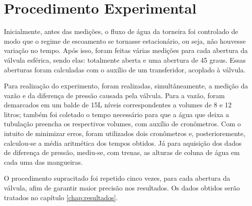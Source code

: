 \chapter{Procedimento Experimental}
\label{chap:procedimento}



Inicialmente, antes das medições, o fluxo de água da torneira foi controlado de
modo que o regime de escoamento se tornasse estacionário, ou seja, não houvesse
variação no tempo. Após isso, foram feitas várias medições para cada abertura da
válvula esférica, sendo elas: totalmente aberta e uma abertura de 45 graus.
Essas aberturas foram calculadas com o auxílio de um transferidor, acoplado à
válvula. 

Para realização do experimento, foram realizadas, simultâneamente, a medição da
vazão e da diferença de pressão causada pela válvula. Para a vazão, foram
demarcados em um balde de 15L níveis correspondentes a volumes de 8 e 12 litros;
também foi coletado o tempo necessário para que a água que deixa a tubulação
preencha os respectivos volumes, com auxílio de cronômetros.  Com o intuito de
minimizar erros, foram utilizados dois cronômetros e, posterioremente,
calculou-se a média aritmética dos tempos obtidos. Já para aquisição dos dados
de diferença de pressão, mediu-se, com trenas, as alturas de coluna de água em
cada uma das mangueiras.

O procedimento supracitado foi repetido cinco vezes, para cada abertura da
válvula, afim de garantir maior precisão nos resultados. Os dados obtidos
serão tratados no capítulo \ref{chap:resultados}.


